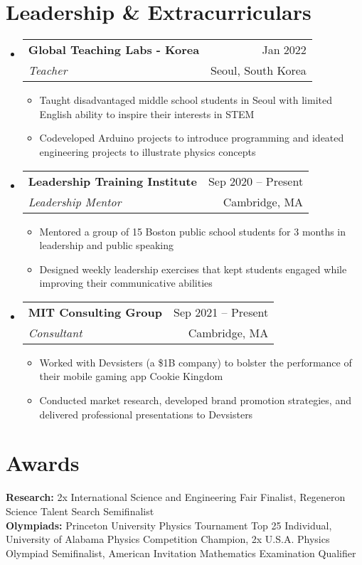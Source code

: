 \documentclass[letterpaper,11pt]{article}
\makeatletter
\newcommand{\resumeItem}[1]{
  \item\small{
    {#1 \vspace{-2pt}}
  }
}
\newcommand{\resumeSubheading}[4]{
  \vspace{-2pt}\item
    \begin{tabular*}{1.0\textwidth}[t]{l@{\extracolsep{\fill}}r}
      \textbf{#1} & {\small #2} \\
      \textit{\small#3} & {\small #4} \\
    \end{tabular*}\vspace{-7pt}
}
\newcommand{\resumeSubHeadingListStart}{\begin{itemize}[leftmargin=0.0in, label={}]}
\newcommand{\resumeSubHeadingListEnd}{\end{itemize}}
\newcommand{\resumeItemListStart}{\begin{itemize}}
\newcommand{\resumeItemListEnd}{\end{itemize}\vspace{-5pt}}
\makeatother
\begin{document}

\section{Leadership \& Extracurriculars}
  \resumeSubHeadingListStart
  
    \resumeSubheading
      {Global Teaching Labs - Korea}{Jan 2022}
      {Teacher}{Seoul, South Korea}
      \resumeItemListStart
        \resumeItem{Taught disadvantaged middle school students in Seoul with limited English ability to inspire their interests in STEM}
        \resumeItem{Codeveloped Arduino projects to introduce programming and ideated engineering projects to illustrate physics concepts}
      \resumeItemListEnd

  \resumeSubHeadingListEnd
\vspace{-12pt}
  \resumeSubHeadingListStart
  
    \resumeSubheading
      {Leadership Training Institute}{Sep 2020 -- Present}
      {Leadership Mentor}{Cambridge, MA}
      \resumeItemListStart
        \resumeItem{Mentored a group of 15 Boston public school students for 3 months in leadership and public speaking}
        \resumeItem{Designed weekly leadership exercises that kept students engaged while improving their communicative abilities}
      \resumeItemListEnd

  \resumeSubHeadingListEnd
  
\vspace{-12pt}
  \resumeSubHeadingListStart
  
    \resumeSubheading
      {MIT Consulting Group}{Sep 2021 -- Present}
      {Consultant}{Cambridge, MA}
      \resumeItemListStart
        \resumeItem{Worked with Devsisters (a \$1B company) to bolster the performance of their mobile gaming app Cookie Kingdom}
        \resumeItem{Conducted market research, developed brand promotion strategies, and delivered professional presentations to Devsisters}
      \resumeItemListEnd

  \resumeSubHeadingListEnd
\vspace{-22pt}


\section{Awards}
\begin{itemize}[leftmargin=0.0in, label={}]
	\small{\item{
			\textbf{Research:} {2x International Science and Engineering Fair Finalist, Regeneron Science Talent Search Semifinalist} \\
			\textbf{Olympiads:} {Princeton University Physics Tournament Top 25 Individual, University of Alabama Physics Competition Champion, 2x U.S.A. Physics Olympiad Semifinalist, American Invitation Mathematics Examination Qualifier} \\

	}}
\end{itemize}


  
\end{document}
